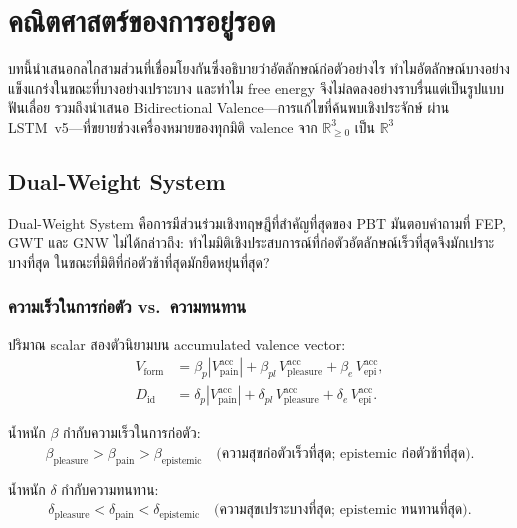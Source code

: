 \documentclass[12pt,a4paper]{article}
\newcommand{\Vform}{V_{\mathrm{form}}}
\newcommand{\Diden}{D_{\mathrm{id}}}
\begin{document}
\FloatBarrier
\section{คณิตศาสตร์ของการอยู่รอด}
\label{sec:mathematics}

บทนี้นำเสนอกลไกสามส่วนที่เชื่อมโยงกันซึ่งอธิบายว่าอัตลักษณ์ก่อตัวอย่างไร
ทำไมอัตลักษณ์บางอย่างแข็งแกร่งในขณะที่บางอย่างเปราะบาง
และทำไม free energy จึงไม่ลดลงอย่างราบรื่นแต่เป็นรูปแบบฟันเลื่อย
รวมถึงนำเสนอ Bidirectional Valence---การแก้ไขที่ค้นพบเชิงประจักษ์
ผ่าน LSTM~v5---ที่ขยายช่วงเครื่องหมายของทุกมิติ valence
จาก $\mathbb{R}^3_{\ge 0}$ เป็น $\mathbb{R}^3$

\subsection{Dual-Weight System}

Dual-Weight System คือการมีส่วนร่วมเชิงทฤษฎีที่สำคัญที่สุดของ PBT
มันตอบคำถามที่ FEP, GWT และ GNW ไม่ได้กล่าวถึง:
ทำไมมิติเชิงประสบการณ์ที่ก่อตัวอัตลักษณ์เร็วที่สุดจึงมักเปราะบางที่สุด
ในขณะที่มิติที่ก่อตัวช้าที่สุดมักยืดหยุ่นที่สุด?

\subsubsection{ความเร็วในการก่อตัว vs.\ ความทนทาน}

ปริมาณ scalar สองตัวนิยามบน accumulated valence vector:
\begin{align}
  \Vform   &= \beta_p|V^{\mathrm{acc}}_{\mathrm{pain}}|
              + \beta_{pl}\,V^{\mathrm{acc}}_{\mathrm{pleasure}}
              + \beta_e\,V^{\mathrm{acc}}_{\mathrm{epi}},
              \label{eq:Vform}\\
  \Diden   &= \delta_p|V^{\mathrm{acc}}_{\mathrm{pain}}|
              + \delta_{pl}\,V^{\mathrm{acc}}_{\mathrm{pleasure}}
              + \delta_e\,V^{\mathrm{acc}}_{\mathrm{epi}}.
              \label{eq:Diden}
\end{align}

น้ำหนัก $\beta$ กำกับความเร็วในการก่อตัว:
\begin{equation}
  \beta_{\mathrm{pleasure}} > \beta_{\mathrm{pain}} > \beta_{\mathrm{epistemic}}
  \quad\text{(ความสุขก่อตัวเร็วที่สุด; epistemic ก่อตัวช้าที่สุด).}
\end{equation}

น้ำหนัก $\delta$ กำกับความทนทาน:
\begin{equation}
  \delta_{\mathrm{pleasure}} < \delta_{\mathrm{pain}} < \delta_{\mathrm{epistemic}}
  \quad\text{(ความสุขเปราะบางที่สุด; epistemic ทนทานที่สุด).}
\end{equation}
\end{document}
